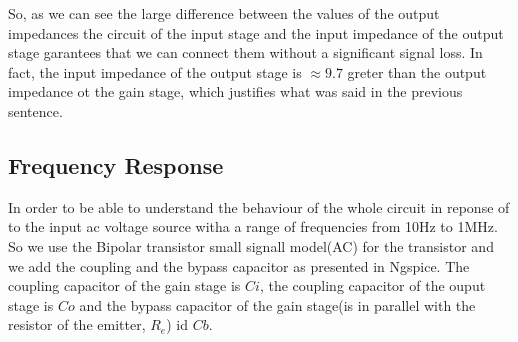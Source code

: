 So, as we can see the large difference between the values of the output impedances the circuit of
the input stage and the input impedance of the output stage garantees that we can connect them without
a significant signal loss.
In fact, the input impedance of the output stage is $\approx 9.7$ greter than the output impedance ot the gain stage,
which justifies what was said in the previous sentence.

\subsection{Frequency Response}

In order to be able to understand the behaviour of the whole circuit in reponse of to the input ac voltage source witha
a range of frequencies from 10Hz to 1MHz.
So we use the Bipolar transistor small signall model(AC) for the transistor and we add the coupling and the bypass capacitor as presented in
Ngspice. The coupling capacitor of the gain stage is $Ci$, the coupling capacitor of the ouput stage is $Co$ and the bypass
capacitor of the gain stage(is in parallel with the resistor of the emitter, $R_e$) id $Cb$.

